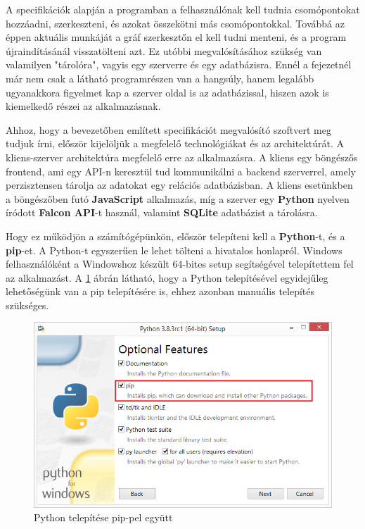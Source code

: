 

A specifikációk alapján a programban a felhasználónak kell tudnia csomópontokat hozzáadni, szerkeszteni, és azokat összekötni más csomópontokkal. Továbbá az éppen aktuális munkáját a gráf szerkesztőn el kell tudni menteni, és a program újraindításánál visszatölteni azt. Ez utóbbi megvalósításához szükség van valamilyen "tárolóra", vagyis egy szerverre és egy adatbázisra. Ennél a fejezetnél már nem csak a látható programrészen van a hangsúly, hanem legalább ugyanakkora figyelmet kap a szerver oldal is az adatbázissal, hiszen azok is kiemelkedő részei az alkalmazásnak.


Ahhoz, hogy a bevezetőben említett specifikációt megvalósító szoftvert meg tudjuk írni, először kijelöljük a megfelelő technológiákat és az architektúrát. A kliens-szerver architektúra megfelelő erre az alkalmazásra. A kliens egy böngészős frontend, ami egy API-n keresztül tud kommunikálni a backend szerverrel, amely perzisztensen tárolja az adatokat egy relációs adatbázisban. A kliens esetünkben a böngészőben futó \textbf{JavaScript} alkalmazás, míg a szerver egy \textbf{Python} nyelven íródott \textbf{Falcon API}-t használ, valamint \textbf{SQLite} adatbázist a tárolásra.
 
Hogy ez működjön a számítógépünkön, először telepíteni kell a \textbf{Python}-t, és a \textbf{pip}-et. A Python-t egyszerűen le lehet tölteni a hivatalos honlapról\cite{pyt}. Windows felhasználóként a Windowshoz készült 64-bites setup segítségével telepítettem fel az alkalmazást. A \ref{fig:pyt1} ábrán látható, hogy a Python telepítésével egyidejűleg lehetőségünk van a pip telepítésére is, ehhez azonban manuális telepítés szükséges.

\begin{figure}[h]
\centering
\includegraphics[scale=0.7]{images/python1.png}
\caption{Python telepítése pip-pel együtt}
\label{fig:pyt1}
\end{figure}

